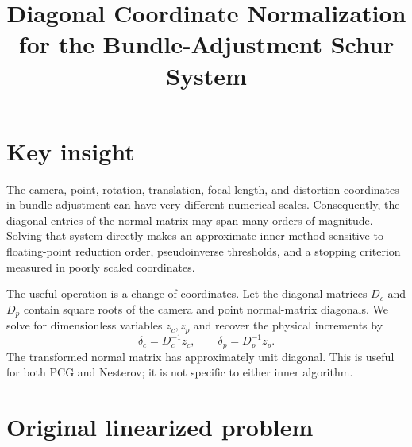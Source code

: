 \documentclass[11pt]{article}
\title{Diagonal Coordinate Normalization for the Bundle-Adjustment Schur System}
\author{}
\date{}
\begin{document}
\maketitle

\section{Key insight}

The camera, point, rotation, translation, focal-length, and distortion
coordinates in bundle adjustment can have very different numerical scales.
Consequently, the diagonal entries of the normal matrix may span many orders of
magnitude.  Solving that system directly makes an approximate inner method
sensitive to floating-point reduction order, pseudoinverse thresholds, and a
stopping criterion measured in poorly scaled coordinates.

The useful operation is a change of coordinates.  Let the diagonal matrices
$D_c$ and $D_p$ contain square roots of the camera and point normal-matrix
diagonals.  We solve for dimensionless variables $z_c,z_p$ and recover the
physical increments by
\begin{equation}
  \delta_c = D_c^{-1} z_c,
  \qquad
  \delta_p = D_p^{-1} z_p.
\end{equation}
The transformed normal matrix has approximately unit diagonal.  This is useful
for both PCG and Nesterov; it is not specific to either inner algorithm.

\section{Original linearized problem}
\end{document}
